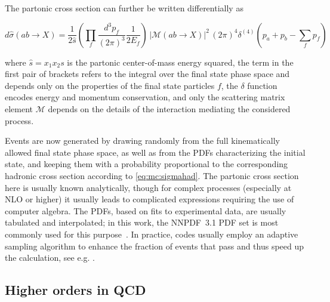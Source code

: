 
The partonic cross section can further be written differentially as~\cite{Peskin:1995ev}

\begin{equation}
    d \hat{\sigma} (a b \rightarrow X) = \frac{1}{2 \hat{s}} \left( \prod_f \frac{d^3 p_f}{(2\pi)^3} \frac{1}{2 E_f} \right) \, \left| \mathcal{M} (a b \rightarrow 
    X ) \right|^2 \, (2\pi)^4 \delta^{(4)} \left( p_a + p_b - \sum_f p_f \right)
\end{equation}

\noindent where $\hat{s} = x_1 x_2 s$ is the partonic center-of-mass energy squared, the term in the first pair of brackets refers to the integral over the final state phase space and depends only on the properties of the final state particles $f$, the $\delta$ function encodes energy and momentum conservation, and only the scattering matrix element $\mathcal{M}$ depends on the details of the interaction mediating the considered process.

Events are now generated by drawing randomly from the full kinematically allowed final state phase space, as well as from the PDFs characterizing the initial state, and keeping them with a probability proportional to the corresponding hadronic cross section according to \cref{eq:mc:sigmahad}. The partonic cross section here is usually known analytically, though for complex processes (especially at NLO or higher) it usually leads to complicated expressions requiring the use of computer algebra. The PDFs, based on fits to experimental data, are usually tabulated and interpolated; in this work, the NNPDF~3.1 PDF set is most commonly used for this purpose~\cite{NNPDF:2017mvq}. In practice, codes usually employ an adaptive sampling algorithm to enhance the fraction of events that pass and thus speed up the calculation, see e.g. .

\subsection{Higher orders in QCD}

